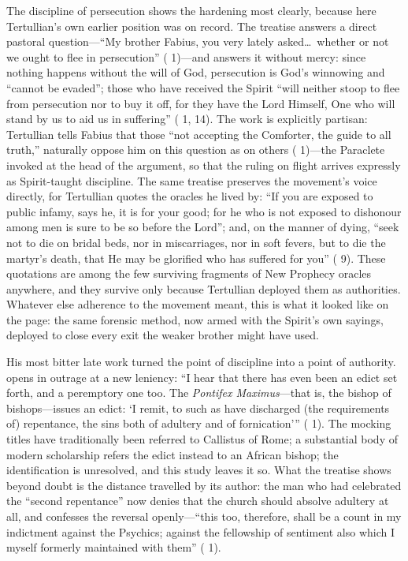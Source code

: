 The discipline of persecution shows the hardening most clearly, because here
Tertullian's own earlier position was on record. The treatise  answers a direct pastoral question---``My brother Fabius, you
very lately asked\ldots\ whether or not we ought to flee in persecution''
( 1)---and answers it without mercy: since
nothing happens without the will of God, persecution is God's winnowing and
``cannot be evaded''; those who have received the Spirit ``will neither stoop
to flee from persecution nor to buy it off, for they have the Lord Himself,
One who will stand by us to aid us in suffering'' ( 1, 14). The work is explicitly partisan: Tertullian tells Fabius
that those ``not accepting the Comforter, the guide to all truth,'' naturally
oppose him on this question as on others (
1)---the Paraclete invoked at the head of the argument, so that the ruling on
flight arrives expressly as Spirit-taught discipline. The same treatise
preserves the movement's voice directly, for Tertullian quotes the oracles he
lived by: ``If you are exposed to public infamy, says he, it is for your
good; for he who is not exposed to dishonour among men is sure to be so
before the Lord''; and, on the manner of dying, ``seek not to die on bridal
beds, nor in miscarriages, nor in soft fevers, but to die the martyr's death,
that He may be glorified who has suffered for you'' ( 9). These quotations are among the few surviving fragments of
New Prophecy oracles anywhere, and they survive only because Tertullian
deployed them as authorities. Whatever else adherence to the movement meant,
this is what it looked like on the page: the same forensic method, now
armed with the Spirit's own sayings, deployed to close every exit the weaker
brother might have used.

His most bitter late work turned the point of discipline into a point of
authority.  opens in outrage at a new leniency: ``I hear that
there has even been an edict set forth, and a peremptory one too. The
\textit{Pontifex Maximus}---that is, the bishop of bishops---issues an edict:
`I remit, to such as have discharged (the requirements of) repentance, the sins
both of adultery and of fornication''' ( 1). The mocking
titles have traditionally been referred to Callistus of Rome; a substantial
body of modern scholarship refers the edict instead to an African bishop; the
identification is unresolved, and this study leaves it so. What
the treatise shows beyond doubt is the distance travelled by its author: the
man who had celebrated the ``second repentance'' now denies that the church
should absolve adultery at all, and confesses the reversal openly---``this too,
therefore, shall be a count in my indictment against the Psychics; against the
fellowship of sentiment also which I myself formerly maintained with them''
( 1).

